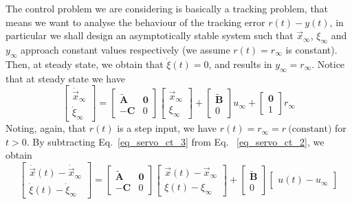 \documentclass[11pt,a4paper,oneside]{book}
\numberwithin{equation}{section}
\theoremstyle{it}
\theoremstyle{definition}
\begin{document}
The control problem we are considering is basically a tracking problem, that 
means we want to analyse the behaviour of the tracking error $r(t) - y(t)$, in 
particular we shall design an asymptotically stable system such that 
$\vec{x}_{\infty}$, $\xi_{\infty}$ and $y_{\infty}$ approach constant values 
respectively (we assume $r(t)=r_{\infty}$ is constant). Then, at steady state, 
we obtain that $\dot{\xi}(t)=0$, and results in $y_{\infty} = r_{\infty}$.
Notice that at steady state we have
\begin{equation}\label{eq_servo_ct_3}
	\begin{bmatrix}
		\dot{\vec{x}}_{\infty} \\[6pt] \dot{\xi}_{\infty}
	\end{bmatrix} = 
	\begin{bmatrix}
		\tilde{\mathbf{A}} & \mathbf{0} \\[6pt]
		-{\mathbf{C}} & 0
	\end{bmatrix} 
	\begin{bmatrix}
		{\vec{x}}_{\infty} \\[6pt] {\xi}_{\infty}
	\end{bmatrix}+
	\begin{bmatrix}
		\tilde{\mathbf{B}} \\[6pt] 0
	\end{bmatrix}u_{\infty}+
	\begin{bmatrix}
		{\mathbf{0}} \\[6pt] 1
	\end{bmatrix}r_{\infty}
\end{equation}
Noting, again, that $r(t)$ is a step input, we have $r(t)=r_{\infty} = r\ 
\text{(constant)}$ for $t > 0$. By subtracting Eq.~\eqref{eq_servo_ct_3} from 
Eq.~
\ref{eq_servo_ct_2}, we obtain
\begin{equation}\label{eq_servo_ct_4}
	\begin{bmatrix}
		\dot{\vec{x}}(t) - \dot{\vec{x}}_{\infty} \\[6pt] 
		\dot{\xi}(t)-\dot{\xi}_{\infty}
	\end{bmatrix} = 
	\begin{bmatrix}
		\tilde{\mathbf{A}} & \mathbf{0} \\[6pt]
		-{\mathbf{C}} & 0
	\end{bmatrix} 
	\begin{bmatrix}
		\vec{x}(t)-{\vec{x}}_{\infty} \\[6pt] {\xi}(t)-{\xi}_{\infty}
	\end{bmatrix}+
	\begin{bmatrix}
		\tilde{\mathbf{B}} \\[6pt] 0
	\end{bmatrix}
	\begin{bmatrix}
		u(t)-u_{\infty}
	\end{bmatrix}
\end{equation}
\end{document}
